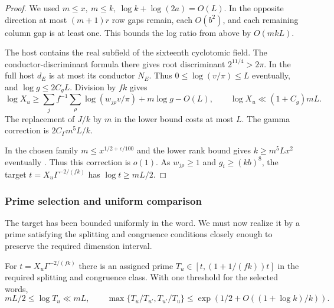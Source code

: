 \begin{proof}
We used \(m\le x,\ m\le k,\ \log k+\log(2a)=O(L)\).
In the opposite direction at most \((m+1)r\) row gaps remain,
each \(O(b^2)\), and each remaining column gap is at least one.
This bounds the log ratio from above by \(O(mkL)\).


The host contains the real subfield of the sixteenth cyclotomic
field. The conductor-discriminant formula there gives root
discriminant \(2^{11/4}>2\pi\). In the full host \(d_E\) is at most
its conductor \(N_E\). Thus \(0\le\log(v/\pi)\le L\) eventually,
and \(\log g\le 2C_gL\). Division by \(fk\) gives
\[
 \log X_u\ge
 \sum_j f^{-1}\sum_\rho\log(w_{j\rho}v/\pi)+m\log g-O(L),
 \qquad \log X_u\ll (1+C_g)mL .
\]
The replacement of \(J/k\) by \(m\) in the lower bound costs
at most \(L\). The gamma correction is \(2C_\Gamma m^5 L/k\).

In the chosen family \(m\le x^{1/2+\epsilon/100}\) and the lower
rank bound gives \(k\ge m^5 L x^2\) eventually
\label{cor:selected-word-level-2}. Thus this correction is \(o(1)\).
As \(w_{j\rho}\ge1\) and \(g_i\ge(kb)^8\), the target
\(t=X_u\Gamma^{-2/(fk)}\) has \(\log t\ge mL/2\).

\end{proof}

\subsubsection{Prime selection and uniform comparison}

The target has been bounded uniformly in the word. We must now realize it by a prime satisfying the splitting and congruence conditions closely enough to preserve the required dimension interval.

\begin{proposition}\label{prop:assigned-prime}
For \(t=X_u\Gamma^{-2/(fk)}\) there is an assigned prime
\(T_u\in[t,(1+1/(fk))t]\) in the required splitting and
congruence class. With one threshold for the selected words, 
\[
 mL/2\le\log T_u\ll mL,\qquad
 \max\{T_u/T_{u'},T_{u'}/T_u\}\le \exp(1/2+O((1+\log k)/k)).
\]

\end{proposition}

